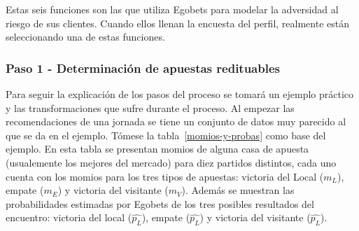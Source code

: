 Estas seis funciones son las que utiliza Egobets para modelar la adversidad al riesgo de sus clientes. Cuando ellos llenan la encuesta del perfil, realmente están seleccionando una de estas funciones.


\subsubsection{Paso 1 - Determinación de apuestas redituables}


Para seguir la explicación de los pasos del proceso se tomará un ejemplo práctico y las transformaciones que sufre durante el proceso. Al empezar las recomendaciones de una jornada se tiene un conjunto de datos muy parecido al que se da en el ejemplo. Tómese la tabla~\ref{momios-y-probas} como base del ejemplo. En esta tabla se presentan momios de alguna casa de apuesta (usualemente los mejores del mercado) para diez partidos distintos, cada uno cuenta con los momios para los tres tipos de apuestas: victoria del Local ($m_L$), empate ($m_E$) y victoria del visitante ($m_V$). Además se muestran las probabilidades estimadas por Egobets de los tres posibles resultados del encuentro: victoria del local ($\hat{p_L}$), empate ($\hat{p_L}$) y victoria del visitante ($\hat{p_L}$).

\begin{table}[h]
\centering
{}
\caption{Diez partidos con sus respectivos momios y las probabilidades estimadas por Egobets}
\label{momios-y-probas}
\end{table}

